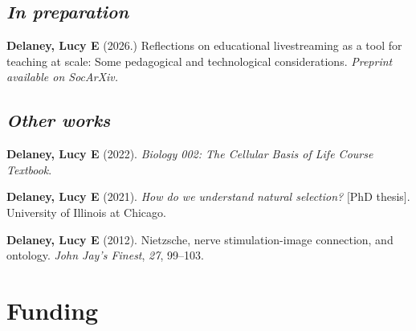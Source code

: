 \documentclass[]{article}
\newlength{\cslhangindent}
\newenvironment{cslreferences}
{\setlength{\parindent}{0pt}
\everypar{\setlength{\hangindent}{\cslhangindent}}\ignorespaces}
{\par}
\providecommand{\tightlist}{%
  \setlength{\itemsep}{0pt}\setlength{\parskip}{3pt}}
\begin{document}
\vspace{-3mm}
\subsection{\fontsize{12}{36}\selectfont \textit{In preparation}}
\vspace{-2mm}

\begin{cslreferences}

\textbf{Delaney, Lucy E} (2026.) Reflections on educational livestreaming as a tool for teaching at scale: Some pedagogical and technological considerations. \textit{Preprint available on SocArXiv.} \href{https://doi.org/10.31235/osf.io/jkuz5_v1}{\faFileDownload}

\end{cslreferences}


\vspace{-3mm}
\subsection{\fontsize{12}{36}\selectfont \textit{Other works}}

\vspace{-3mm}

\begin{cslreferences}
\tightlist
\textbf{Delaney, Lucy E} (2022). \emph{Biology 002: The Cellular Basis of Life Course Textbook}. \href{https://ledelaney.org/teaching/2022/spring/biol002/_main.pdf}{\faFileDownload}\\
\vspace{-4mm}

\textbf{Delaney, Lucy E} (2021). \emph{How do we understand natural selection?} $[$PhD thesis$]$. University of Illinois at Chicago. \href{https://ledelaney.org/static/docs/Delaney_Lucy_E_Thesis.pdf}{\faFileDownload}\\
\vspace{-4mm}

\textbf{Delaney, Lucy E} (2012). Nietzsche, nerve stimulation-image connection, and ontology. \emph{John Jay's Finest}, \emph{27}, 99--103. \href{https://ledelaney.org/static/docs/Delaney-JJAYFinest.pdf}{\faFileDownload}
\end{cslreferences}


 \vspace{7.5mm}

\section{\fontsize{16}{48}\selectfont Funding}
\end{document}
